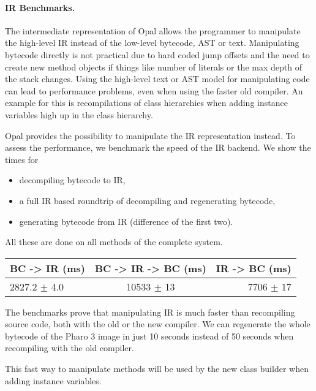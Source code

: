 \documentclass[preprint,10pt]{sigplanconf}
\begin{document}
\paragraph{IR Benchmarks.}

The intermediate representation of Opal allows the programmer to manipulate the high-level IR instead of the low-level bytecode, AST or text. Manipulating bytecode
directly is not practical due to hard coded jump offsets and the need to create new method objects if things like number of literals or the max depth of the stack changes.
Using the high-level text or AST model for manipulating code can lead to performance problems, even when using the faster old compiler. An example for this is recompilations of class hierarchies when adding instance variables high up in the class hierarchy.

Opal provides the possibility to manipulate the IR representation instead. To assess the performance, we benchmark the speed of the IR backend. We show the times for

\begin{itemize}
\item decompiling bytecode to IR,
\item a full IR based roundtrip of decompiling and regenerating bytecode,
\item generating bytecode from IR (difference of the first two).
\end{itemize}

All these are done on all methods of the complete system.

\vspace{0.2cm}
\begin{center}
\begin{tabular}{|l|c|r|}
  \hline
BC -> IR (ms) & BC -> IR -> BC (ms) & IR -> BC (ms) \\
  \hline
  2827.2 $\pm$ 4.0 & 10533 $\pm$ 13 & 7706 $\pm$ 17\\ 
  \hline
\end{tabular}
\end{center}

The benchmarks prove that manipulating IR is much faster than recompiling source code, both with the old or the new compiler. We can
regenerate the whole bytecode of the Pharo 3 image in just 10 seconds instead of 50 seconds when recompiling with the old compiler.

This fast way to manipulate methods will be used by the new class builder when adding instance variables.
\end{document}
